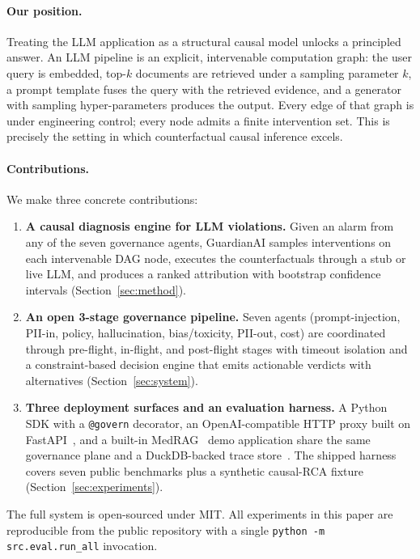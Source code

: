 \documentclass[11pt,letterpaper]{article}
\begin{document}
\paragraph{Our position.}
Treating the LLM application as a structural causal model
\cite{pearl2009causality,scholkopf2021causal} unlocks a principled
answer.  An LLM pipeline is an explicit, intervenable computation
graph: the user query is embedded, top-$k$ documents are retrieved
under a sampling parameter $k$, a prompt template fuses the query
with the retrieved evidence, and a generator with sampling
hyper-parameters produces the output.  Every edge of that graph is
under engineering control; every node admits a finite intervention
set.  This is precisely the setting in which counterfactual causal
inference excels.

\paragraph{Contributions.}
We make three concrete contributions:

\begin{enumerate}
\item \textbf{A causal diagnosis engine for LLM violations.} Given an
  alarm from any of the seven governance agents, GuardianAI samples
  interventions on each intervenable DAG node, executes the
  counterfactuals through a stub or live LLM, and produces a ranked
  attribution with bootstrap confidence intervals
  (Section~\ref{sec:method}).
\item \textbf{An open 3-stage governance pipeline.} Seven agents
  (prompt-injection, PII-in, policy, hallucination, bias/toxicity,
  PII-out, cost) are coordinated through pre-flight, in-flight, and
  post-flight stages with timeout isolation and a constraint-based
  decision engine that emits actionable verdicts with alternatives
  (Section~\ref{sec:system}).
\item \textbf{Three deployment surfaces and an evaluation harness.} A
  Python SDK with a \texttt{@govern} decorator, an OpenAI-compatible
  HTTP proxy built on FastAPI~\cite{ramirez2018fastapi}, and a
  built-in MedRAG~\cite{lewis2020rag} demo application share the same
  governance plane and a DuckDB-backed trace
  store~\cite{raasveldt2019duckdb}.  The shipped harness covers seven
  public benchmarks plus a synthetic causal-RCA fixture
  (Section~\ref{sec:experiments}).
\end{enumerate}

The full system is open-sourced under MIT.  All experiments in this
paper are reproducible from the public repository with a single
\texttt{python -m src.eval.run\_all} invocation.
\end{document}
